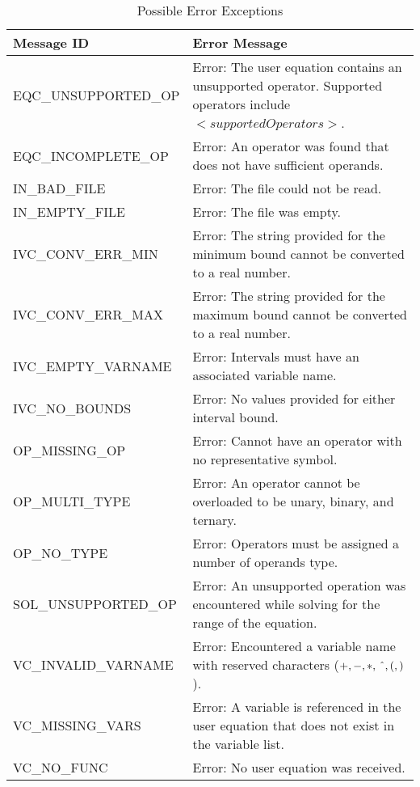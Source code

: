 \documentclass[12pt, titlepage]{article}
\begin{document}
\begin{longtable}{l p{9.5cm}}
	\caption{Possible Error Exceptions} \\
	\toprule
	\textbf{Message ID} & \textbf{Error Message} \\
	\midrule
	EQC\_UNSUPPORTED\_OP & Error: The user equation contains an unsupported 
	operator. Supported operators include $<supportedOperators>$.\\
	EQC\_INCOMPLETE\_OP & Error: An operator was found that does not have 
	sufficient operands. \\
	IN\_BAD\_FILE & Error: The file could not be read. \\
	IN\_EMPTY\_FILE & Error: The file was empty. \\
	IVC\_CONV\_ERR\_MIN & Error: The string provided for the minimum bound 
	cannot be converted to a real number. \\
	IVC\_CONV\_ERR\_MAX & Error: The string provided for the maximum bound 
	cannot be converted to a real number.\\
	IVC\_EMPTY\_VARNAME & Error: Intervals must have an associated variable 
	name. \\
	IVC\_NO\_BOUNDS & Error: No values provided for either interval bound. \\
	OP\_MISSING\_OP & Error: Cannot have an operator with no representative symbol. \\
	OP\_MULTI\_TYPE & Error: An operator cannot be overloaded to be unary, 
	binary, and ternary. \\
	OP\_NO\_TYPE & Error: Operators must be assigned a number of operands type. 
	\\
	SOL\_UNSUPPORTED\_OP & Error: An unsupported operation was encountered 
	while solving for the range of the equation.\\
	VC\_INVALID\_VARNAME & Error: Encountered a variable name with reserved 
	characters ($+, - , *, \, \string^, (, )$). \\
	VC\_MISSING\_VARS & Error: A variable is referenced in the user equation 
	that does not exist in the variable list. \\
	VC\_NO\_FUNC & Error: No user equation was received. \\
	\bottomrule
\end{longtable}

\newpage
\end{document}
